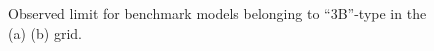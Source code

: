 \clearpage
\begin{figure}[h]
  \centering
    \caption{
    Observed limit for benchmark models belonging to ``3B''-type in the (a) \xhalf (b) \varx grid.
      \label{fig::Result::combLimit::3B1} }
\end{figure}

